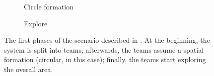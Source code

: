 \begin{figure}[t]
\begin{subfigure}{0.29\textwidth}
  \caption{Circle formation}
  \label{coordination2023-macro:fig:circle-formation}
\end{subfigure}
\hfill
\begin{subfigure}{0.29\textwidth}
  \centering
  \caption{Explore}
  \label{coordination2023-macro:fig:explore}
\end{subfigure}
\caption[\MacroSwarm{} graphical simulations example]{The first phases of the scenario described in . 
 At the beginning, the system is split into teams; 
 afterwards, the teams assume a spatial formation (circular, in this case);
 finally, the teams start exploring the overall area.}\label{coordination2023-macro:fig:scenario}
\end{figure}

